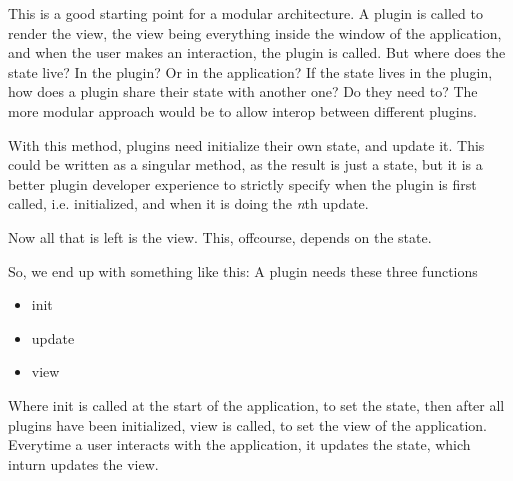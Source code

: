\documentclass[runningheads]{llncs}
\begin{document}
This is a good starting point for a modular architecture. A plugin is called to
render the view, the view being everything inside the window of the application,
and when the user makes an interaction, the plugin is called. But where does the
state live? In the plugin? Or in the application? If the state lives in the
plugin, how does a plugin share their state with another one? Do they need to?
The more modular approach would be to allow interop between different plugins.


With this method, plugins need initialize their own state, and update it. This
could be written as a singular method, as the result is just a state, but it is
a better plugin developer experience to strictly specify when the plugin is
first called, i.e. initialized, and when it is doing the \textit{n}th update.

Now all that is left is the view. This, offcourse, depends on the state.


So, we end up with something like this:
A plugin needs these three functions
\begin{itemize}
  \item init
  \item update
  \item view
\end{itemize}
Where init is called at the start of the application, to set the state, then
after all plugins have been initialized, view is called, to set the view of the
application. Everytime a user interacts with the application, it updates the
state, which inturn updates the view.

\end{document}
